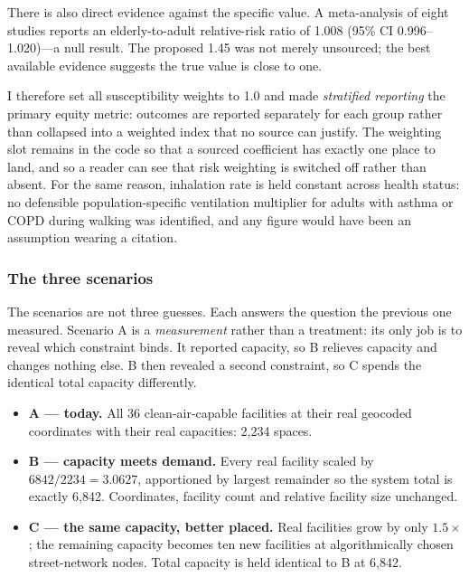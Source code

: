 \documentclass[graybox]{svmult}
\begin{document}
There is also direct evidence against the specific value. A meta-analysis of
eight studies reports an elderly-to-adult relative-risk ratio of 1.008 (95\% CI
0.996--1.020)---a null result. The proposed 1.45 was not merely unsourced; the
best available evidence suggests the true value is close to one.

I therefore set all susceptibility weights to 1.0 and made \emph{stratified
reporting} the primary equity metric: outcomes are reported separately for each
group rather than collapsed into a weighted index that no source can justify.
The weighting slot remains in the code so that a sourced coefficient has exactly
one place to land, and so a reader can see that risk weighting is switched off
rather than absent. For the same reason, inhalation rate is held constant across
health status: no defensible population-specific ventilation multiplier for
adults with asthma or COPD during walking was identified, and any figure would
have been an assumption wearing a citation.

\subsubsection{The three scenarios}
\label{subsec:scenarios}

The scenarios are not three guesses. Each answers the question the previous one
measured. Scenario A is a \emph{measurement} rather than a treatment: its only
job is to reveal which constraint binds. It reported capacity, so B relieves
capacity and changes nothing else. B then revealed a second constraint, so C
spends the identical total capacity differently.

\begin{itemize}
\item \textbf{A --- today.} All 36 clean-air-capable facilities at their real
geocoded coordinates with their real capacities: 2,234 spaces.
\item \textbf{B --- capacity meets demand.} Every real facility scaled by
$6842/2234 = 3.0627$, apportioned by largest remainder so the system total is
exactly 6,842. Coordinates, facility count and relative facility size unchanged.
\item \textbf{C --- the same capacity, better placed.} Real facilities grow by
only $1.5\times$; the remaining capacity becomes ten new facilities at
algorithmically chosen street-network nodes. Total capacity is held identical to
B at 6,842.
\end{itemize}
\end{document}
